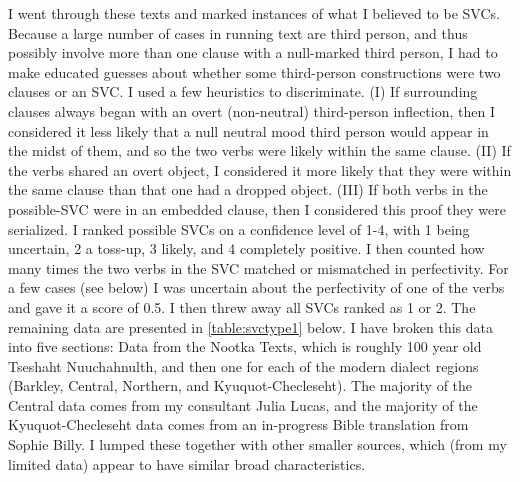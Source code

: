 I went through these texts and marked instances of what I believed to be SVCs. Because a large number of cases in running text are third person, and thus possibly involve more than one clause with a null-marked third person, I had to make educated guesses about whether some third-person constructions were two clauses or an SVC. I used a few heuristics to discriminate. (I) If surrounding clauses always began with an overt (non-neutral) third-person inflection, then I considered it less likely that a null neutral mood third person would appear in the midst of them, and so the two verbs were likely within the same clause. (II) If the verbs shared an overt object, I considered it more likely that they were within the same clause than that one had a dropped object. (III) If both verbs in the possible-SVC were in an embedded clause, then I considered this proof they were serialized. I ranked possible SVCs on a confidence level of 1-4, with 1 being uncertain, 2 a toss-up, 3 likely, and 4 completely positive. I then counted how many times the two verbs in the SVC matched or mismatched in perfectivity. For a few cases (see below) I was uncertain about the perfectivity of one of the verbs and gave it a score of 0.5. I then threw away all SVCs ranked as 1 or 2. The remaining data are presented in \cref{table:svctype1} below. I have broken this data into five sections: Data from the Nootka Texts, which is roughly 100 year old Tseshaht Nuuchahnulth, and then one for each of the modern dialect regions (Barkley, Central, Northern, and Kyuquot-Checleseht). The majority of the Central data comes from my consultant Julia Lucas, and the majority of the Kyuquot-Checleseht data comes from an in-progress Bible translation from Sophie Billy. I lumped these together with other smaller sources, which (from my limited data) appear to have similar broad characteristics.

